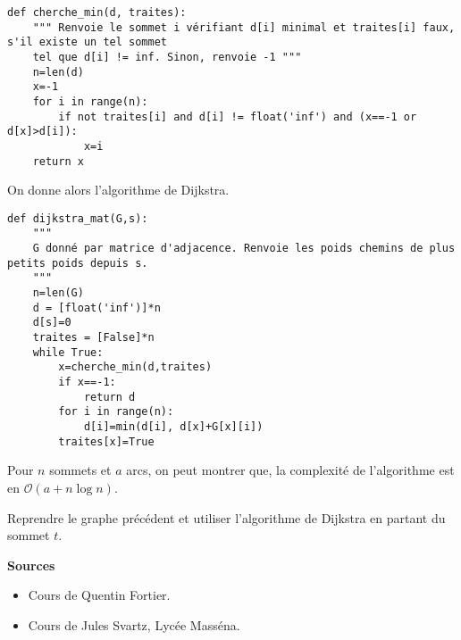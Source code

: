 \begin{lstlisting}
def cherche_min(d, traites):
    """ Renvoie le sommet i vérifiant d[i] minimal et traites[i] faux, s'il existe un tel sommet
    tel que d[i] != inf. Sinon, renvoie -1 """
    n=len(d)
    x=-1
    for i in range(n):
        if not traites[i] and d[i] != float('inf') and (x==-1 or d[x]>d[i]):
            x=i
    return x
\end{lstlisting}


On donne alors l'algorithme de Dijkstra.

\begin{lstlisting}
def dijkstra_mat(G,s):
    """ 
    G donné par matrice d'adjacence. Renvoie les poids chemins de plus petits poids depuis s. 
    """
    n=len(G)
    d = [float('inf')]*n
    d[s]=0
    traites = [False]*n
    while True:
        x=cherche_min(d,traites)
        if x==-1:
            return d
        for i in range(n):
            d[i]=min(d[i], d[x]+G[x][i])
        traites[x]=True
\end{lstlisting}

\begin{prop}
Pour $n$ sommets et $a$ arcs, on peut montrer que, la complexité de l'algorithme est en $\mathcal{O}\left(a+n\log n\right)$.
\end{prop}

\begin{exemple}
Reprendre le graphe précédent et utiliser l'algorithme de Dijkstra en partant du sommet $t$.
\end{exemple}

\vfill
\textbf{Sources}
\begin{itemize}
\item Cours de Quentin Fortier.
\item Cours de Jules Svartz, Lycée Masséna.
\end{itemize}